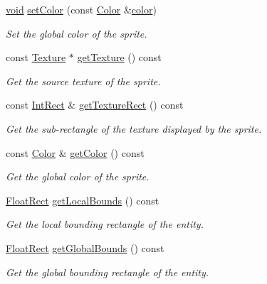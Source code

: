 \begin{DoxyCompactItemize}
\hyperlink{glutf90_8h_ac778d6f63f1aaf8ebda0ce6ac821b56e}{void} \hyperlink{classsf_1_1_sprite_a14def44da6437bfea20c4df5e71aba4c}{set\-Color} (const \hyperlink{classsf_1_1_color}{Color} \&\hyperlink{gl3_8h_a3ea846f998d64f079b86052b6c4193a8}{color})
\begin{DoxyCompactList}\small\item\em Set the global color of the sprite. \end{DoxyCompactList}\item 
const \hyperlink{classsf_1_1_texture}{Texture} $\ast$ \hyperlink{classsf_1_1_sprite_a2c4fbb983b29e14f9bb69a3a75feae46}{get\-Texture} () const 
\begin{DoxyCompactList}\small\item\em Get the source texture of the sprite. \end{DoxyCompactList}\item 
const \hyperlink{namespacesf_aae67411782674934f78d55fa3af18403}{Int\-Rect} \& \hyperlink{classsf_1_1_sprite_a89aa58bc39e2072c6afe7c547d27b5a0}{get\-Texture\-Rect} () const 
\begin{DoxyCompactList}\small\item\em Get the sub-\/rectangle of the texture displayed by the sprite. \end{DoxyCompactList}\item 
const \hyperlink{classsf_1_1_color}{Color} \& \hyperlink{classsf_1_1_sprite_ab05fafd4e9999608a5cae4985e7b52df}{get\-Color} () const 
\begin{DoxyCompactList}\small\item\em Get the global color of the sprite. \end{DoxyCompactList}\item 
\hyperlink{namespacesf_aed4e58f586b2eed2621c0365d0b7554e}{Float\-Rect} \hyperlink{classsf_1_1_sprite_a69557a8369bc2e26dd2e2eb2c50f5c90}{get\-Local\-Bounds} () const 
\begin{DoxyCompactList}\small\item\em Get the local bounding rectangle of the entity. \end{DoxyCompactList}\item 
\hyperlink{namespacesf_aed4e58f586b2eed2621c0365d0b7554e}{Float\-Rect} \hyperlink{classsf_1_1_sprite_a203d2d8087bfdca2ebc3c0485cdb7409}{get\-Global\-Bounds} () const 
\begin{DoxyCompactList}\small\item\em Get the global bounding rectangle of the entity. \end{DoxyCompactList}\end{DoxyCompactItemize}



